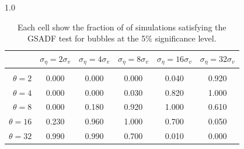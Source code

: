 \documentclass[12pt]{article}
\begin{document}
\begin{table}[h!]
\vspace{10pt}
\begin{subtable}{1.0\textwidth}
    \centering
\begin{tabular}{rccccc}
\hline  
            & \multicolumn{1}{l}{$\sigma_{\eta} =2\sigma_{v}$} & \multicolumn{1}{l}{$\sigma_{\eta} =4\sigma_{v}$} & \multicolumn{1}{l}{$\sigma_{\eta} =8\sigma_{v}$} & \multicolumn{1}{l}{$\sigma_{\eta} =16\sigma_{v}$} & \multicolumn{1}{l}{$\sigma_{\eta} =32\sigma_{v}$} \\ \hline  \vspace{-3mm} \\        
$\theta=2$  & 0.000                                             & 0.000                                             & 0.000                                             & 0.040                                              & 0.920                                              \\ \hline
$\theta=4$  & 0.000                                             & 0.000                                             & 0.030                                             & 0.820                                              & 1.000                                              \\ \hline
$\theta=8$  & 0.000                                             & 0.180                                             & 0.920                                             & 1.000                                              & 0.610                                              \\ \hline
$\theta=16$ & 0.230                                             & 0.960                                             & 1.000                                             & 0.700                                              & 0.050                                              \\ \hline
$\theta=32$ & 0.990                                             & 0.990                                             & 0.700                                             & 0.010                                              & 0.000                                              \\ \hline
\end{tabular}
\end{subtable}

\caption{Each cell show the fraction of of simulations satisfying the GSADF test for bubbles at the 5\% significance level.}
\label{GSADFtestsamps}
\end{table}
\pagebreak
\end{document}
